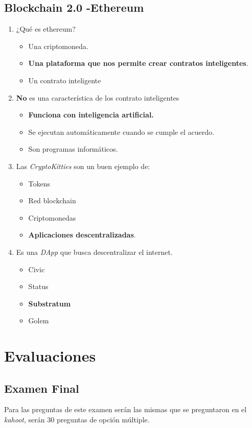 \documentclass[a4paper,12pt]{/home/armando/Documentos/Cursos/LaTeX/Plantillas/lib/pub}
\begin{document}
\subsection{Blockchain 2.0 -Ethereum}
\begin{enumerate}
	\item ¿Qué es ethereum?
	\begin{itemize}
		\item Una criptomoneda.
		\item \textbf{Una plataforma que nos permite crear contratos inteligentes}.
		\item Un contrato inteligente
	\end{itemize}
	\item \textbf{No} es una característica de los contrato inteligentes
	\begin{itemize}
		\item \textbf{Funciona con inteligencia artificial.}
		\item  Se ejecutan automáticamente cuando se cumple el acuerdo.
		\item Son programas informáticos.
	\end{itemize}
	\item Las \textit{CryptoKitties} son un buen ejemplo de:
	\begin{itemize}
		\item Tokens
		\item Red blockchain
		\item Criptomonedas
		\item \textbf{Aplicaciones descentralizadas}.
	\end{itemize}
	\item Es una \textit{DApp} que busca descentralizar el internet.
	\begin{itemize}
		\item Civic
		\item Status
		\item \textbf{Substratum}
		\item Golem
	\end{itemize} 
\end{enumerate}
\section{Evaluaciones}
\subsection{Examen Final}
Para las preguntas de este examen serán las mismas que se preguntaron en el \textit{kahoot}, serán 30 preguntas de opción múltiple.
\end{document}
